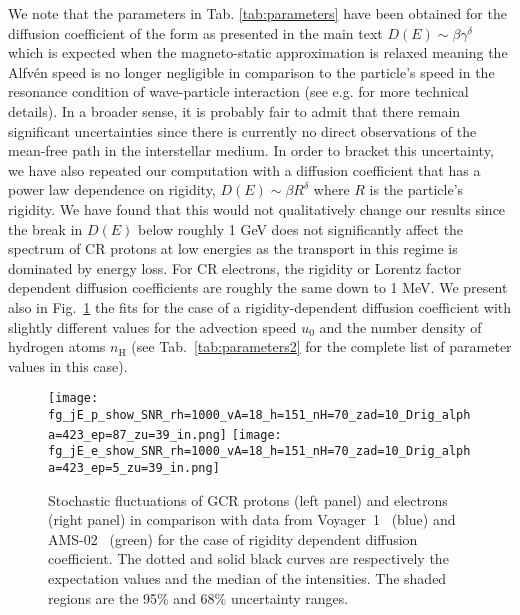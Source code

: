 We note that the parameters in Tab. \ref{tab:parameters} have been obtained for the diffusion coefficient of the form as presented in the main text $D(E)\sim\beta \gamma^{\delta}$ which is expected when the magneto-static approximation is relaxed meaning the Alfv\'en speed is no longer negligible in comparison to the particle's speed in the resonance condition of wave-particle interaction (see e.g. \cite{schlickeiser1999,schlickeiser2010} for more technical details). In a broader sense, it is probably fair to admit that there remain significant uncertainties since there is currently no direct observations of the mean-free path in the interstellar medium. In order to bracket this uncertainty, we have also repeated our computation with a diffusion coefficient that has a power law dependence on rigidity, $D(E)\sim \beta R^\delta$ where $R$ is the particle's rigidity. We have found that this would not qualitatively change our results since the break in $D(E)$ below roughly 1 GeV does not significantly affect the spectrum of CR protons at low energies as the transport in this regime is dominated by energy loss. For CR electrons, the rigidity or Lorentz factor dependent diffusion coefficients are roughly the same down to 1 MeV. We present also in Fig.~\ref{fg:Drig} the fits for the case of a rigidity-dependent diffusion coefficient with slightly different values for the advection speed $u_0$ and the number density of hydrogen atoms $n_\mathrm{H}$ (see Tab.~\ref{tab:parameters2} for the complete list of parameter values in this case).%

\begin{figure}[h]
\centerline{
\texttt{[image: fg\_jE\_p\_show\_SNR\_rh=1000\_vA=18\_h=151\_nH=70\_zad=10\_Drig\_alpha=423\_ep=87\_zu=39\_in.png]}
\texttt{[image: fg\_jE\_e\_show\_SNR\_rh=1000\_vA=18\_h=151\_nH=70\_zad=10\_Drig\_alpha=423\_ep=5\_zu=39\_in.png]}}
\caption{Stochastic fluctuations of GCR protons (left panel) and electrons (right panel) in comparison with data from Voyager~1~\cite{cummings2016} (blue) and AMS-02~\cite{AMS2014,AMS2015} (green) for the case of rigidity dependent diffusion coefficient. The dotted and solid black curves are respectively the expectation values and the median of the intensities. The shaded regions are the 95\% and 68\% uncertainty ranges.}
\label{fg:Drig}
\end{figure}

